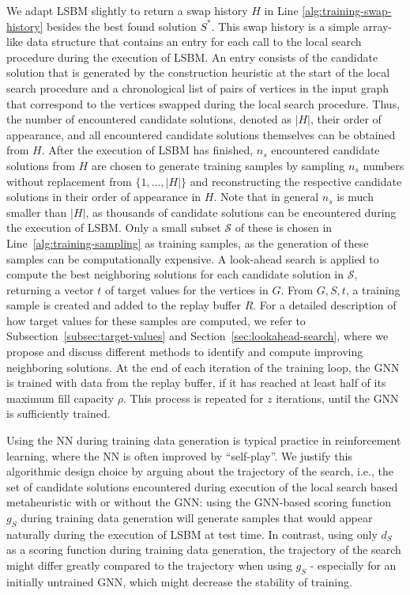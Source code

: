 \documentclass[draft,final]{vutinfth} %
\begin{document}
We adapt LSBM slightly to return a swap history $H$ in Line \ref{alg:training-swap-history} besides the best found solution $S^*$. This swap history is a simple array-like data structure that contains an entry for each call to the local search procedure during the execution of LSBM. An entry consists of the candidate solution that is generated by the construction heuristic at the start of the local search procedure and a chronological list of pairs of vertices in the input graph that correspond to the vertices swapped during the local search procedure. Thus, the number of encountered candidate solutions, denoted as $|H|$, their order of appearance, and all encountered candidate solutions themselves can be obtained from $H$. 
After the execution of LSBM has finished, $n_s$ encountered candidate solutions from $H$ are chosen to generate training samples by sampling $n_s$ numbers without replacement from $\{1, \dots, |H|\}$ and reconstructing the respective candidate solutions in their order of appearance in $H$. 
Note that in general $n_s$ is much smaller than $|H|$, as thousands of candidate solutions can be encountered during the execution of LSBM. Only a small subset $\mathcal{S}$ of these is chosen in Line~\ref{alg:training-sampling} as training samples, as the generation of these samples can be computationally expensive. 
A look-ahead search is applied to compute the best neighboring solutions for each candidate solution in $\mathcal{S}$, returning a vector $t$ of target values for the vertices in $G$. From $G, S, t$, a training sample is created and added to the replay buffer $R$. For a detailed description of how target values for these samples are computed, we refer to Subsection~\ref{subsec:target-values} and Section~\ref{sec:lookahead-search}, where we propose and discuss different methods to identify and compute improving neighboring solutions. 
At the end of each iteration of the training loop, the GNN is trained with data from the replay buffer, if it has reached at least half of its maximum fill capacity $\rho$. 
This process is repeated for $z$ iterations, until the GNN is sufficiently trained. 

Using the NN during training data generation is typical practice in reinforcement learning, where the NN is often improved by ``self-play''. 
We justify this algorithmic design choice by arguing about the trajectory of the search, i.e., the set of candidate solutions encountered during execution of the local search based metaheuristic with or without the GNN: using the GNN-based scoring function $g_S$ during training data generation will generate samples that would appear naturally during the execution of LSBM at test time. In contrast, using only $d_S$ as a scoring function during training data generation, the trajectory of the search might differ greatly compared to the trajectory when using $g_S$ - especially for an initially untrained GNN, which might decrease the stability of training. 
\end{document}
